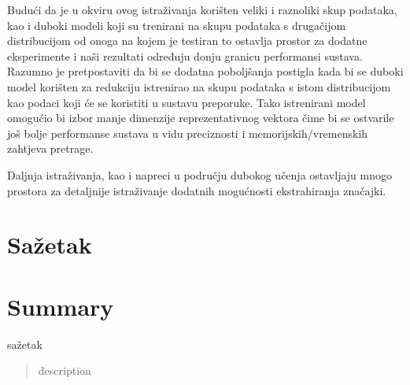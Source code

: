 \documentclass[times, utf8, proizvoljni, numeric]{fer}
\begin{document}
Budući da je u okviru ovog istraživanja korišten veliki i raznoliki skup podataka, kao i duboki modeli koji su trenirani na skupu podataka s drugačijom distribucijom od onoga na kojem je testiran to ostavlja prostor za dodatne eksperimente i naši rezultati određuju donju granicu performansi sustava. Razumno je pretpostaviti da bi se dodatna poboljšanja postigla kada bi se duboki model korišten za redukciju istrenirao na skupu podataka s istom distribucijom kao podaci koji će se koristiti u sustavu preporuke. Tako istrenirani model omogućio bi izbor manje dimenzije reprezentativnog vektora čime bi se ostvarile još bolje performanse sustava u vidu preciznosti i memorijskih/vremenskih zahtjeva pretrage.

Daljnja istraživanja, kao i napreci u području dubokog učenja ostavljaju mnogo prostora za detaljnije istraživanje dodatnih mogućnosti ekstrahiranja značajki.

\chapter{Sažetak}


\chapter{Summary}



\pagebreak
\begin{sazetak}
	sažetak
	
\end{sazetak}

\begin{abstract}
	description
	
\end{abstract}
\end{document}
